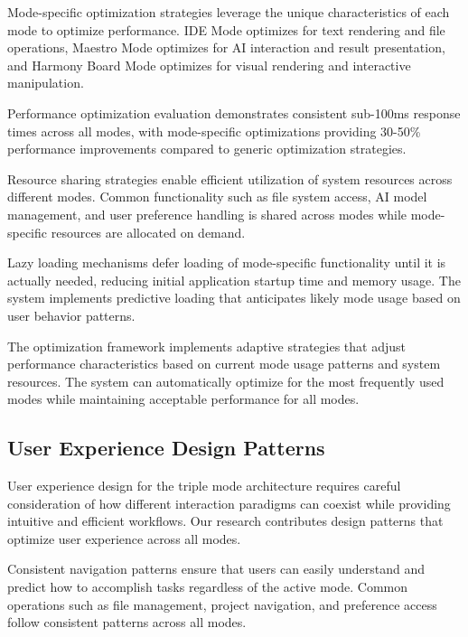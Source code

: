 Mode-specific optimization strategies leverage the unique characteristics of each mode to optimize performance. IDE Mode optimizes for text rendering and file operations, Maestro Mode optimizes for AI interaction and result presentation, and Harmony Board Mode optimizes for visual rendering and interactive manipulation.

\begin{successbox}
Performance optimization evaluation demonstrates consistent sub-100ms response times across all modes, with mode-specific optimizations providing 30-50\% performance improvements compared to generic optimization strategies.
\end{successbox}

Resource sharing strategies enable efficient utilization of system resources across different modes. Common functionality such as file system access, AI model management, and user preference handling is shared across modes while mode-specific resources are allocated on demand.

Lazy loading mechanisms defer loading of mode-specific functionality until it is actually needed, reducing initial application startup time and memory usage. The system implements predictive loading that anticipates likely mode usage based on user behavior patterns.

The optimization framework implements adaptive strategies that adjust performance characteristics based on current mode usage patterns and system resources. The system can automatically optimize for the most frequently used modes while maintaining acceptable performance for all modes.

\subsection*{User Experience Design Patterns}

User experience design for the triple mode architecture requires careful consideration of how different interaction paradigms can coexist while providing intuitive and efficient workflows. Our research contributes design patterns that optimize user experience across all modes.

Consistent navigation patterns ensure that users can easily understand and predict how to accomplish tasks regardless of the active mode. Common operations such as file management, project navigation, and preference access follow consistent patterns across all modes.

